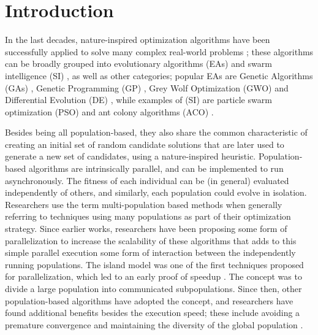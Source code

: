 \documentclass[review]{elsarticle}
\begin{document}
\linenumbers

\section{Introduction}

In the last decades, nature-inspired optimization algorithms have been successfully
applied to solve many complex real-world problems
\cite{yang2014nature}; these algorithms can be broadly grouped into evolutionary algorithms (EAs)
\cite{back1996evolutionary} and swarm intelligence (SI)
\cite{kennedy2006swarm}, as well as other categories; popular EAs
are Genetic Algorithms (GAs) \cite{holland1992adaptation,eiben2003genetic}, 
Genetic Programming (GP) \cite{back1996evolutionary}, Grey Wolf Optimization
(GWO) \cite{mirjalili2014grey} and Differential Evolution (DE) \cite{karabouga2004simple},
while examples of (SI) \cite{kennedy2006swarm} are particle swarm
optimization (PSO) \cite{clerc2010particle} and ant colony algorithms (ACO) \cite{dorigo1999ant}.

Besides being all population-based, they also share the common characteristic
of creating an initial set of random candidate solutions that are later used to
generate a new set of candidates, using a nature-inspired heuristic.
Population-based algorithms are intrinsically parallel, and can be implemented to run asynchronously.
The fitness of each individual can be (in general) evaluated independently of 
others, and similarly, each population could evolve in isolation. Researchers use the term
multi-population based methods when generally referring to techniques using
many populations as part of their optimization strategy. 
Since 
earlier works, researchers have been proposing some form of parallelization
\cite{muhlenbein1988evolution} to increase the scalability of these
algorithms that adds to this simple parallel execution some form of
interaction between the independently running populations.
The island model was one of the first techniques proposed for parallelization,
which led to an early proof of speedup   \cite{gorges1990explicit,grosso1985computer}. 
The concept was to divide a large population into communicated subpopulations. 
Since then, other population-based algorithms have adopted the concept, 
and researchers have found additional benefits
besides the execution speed; these include avoiding a premature convergence and
maintaining the diversity of the global population \cite{li2015multi}. 
\end{document}
